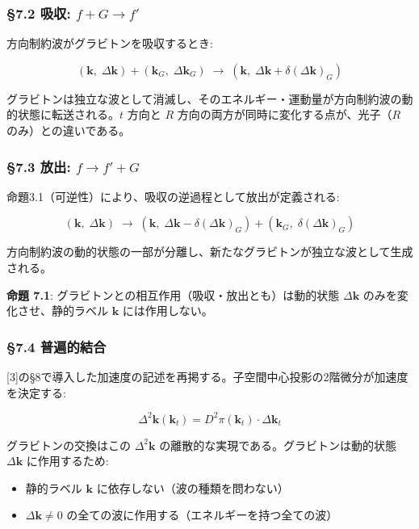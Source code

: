 \documentclass[
  a4paper,11pt]{ltjsarticle}
\providecommand{\tightlist}{%
  \setlength{\itemsep}{0pt}\setlength{\parskip}{0pt}}
\theoremstyle{definition}
\theoremstyle{remark}
\begin{document}
\subsubsection{\texorpdfstring{§7.2 吸収:
\(f + G \to f'\)}{§7.2 吸収: f + G \textbackslash to f\textquotesingle{}}}\label{ux5438ux53ce-f-g-to-f}

方向制約波がグラビトンを吸収するとき:

\[(\mathbf{k},\; \Delta\mathbf{k}) + (\mathbf{k}_G,\; \Delta\mathbf{k}_G) \;\longrightarrow\; (\mathbf{k},\; \Delta\mathbf{k} + \delta(\Delta\mathbf{k})_G)\]

グラビトンは独立な波として消滅し、そのエネルギー・運動量が方向制約波の動的状態に転送される。\(t\)
方向と \(R\) 方向の両方が同時に変化する点が、光子（\(R\)
のみ）との違いである。

\subsubsection{\texorpdfstring{§7.3 放出:
\(f \to f' + G\)}{§7.3 放出: f \textbackslash to f\textquotesingle{} + G}}\label{ux653eux51fa-f-to-f-g}

命題3.1（可逆性）により、吸収の逆過程として放出が定義される:

\[(\mathbf{k},\; \Delta\mathbf{k}) \;\longrightarrow\; (\mathbf{k},\; \Delta\mathbf{k} - \delta(\Delta\mathbf{k})_G) + (\mathbf{k}_G,\; \delta(\Delta\mathbf{k})_G)\]

方向制約波の動的状態の一部が分離し、新たなグラビトンが独立な波として生成される。

\textbf{命題 7.1}: グラビトンとの相互作用（吸収・放出とも）は動的状態
\(\Delta\mathbf{k}\) のみを変化させ、静的ラベル \(\mathbf{k}\)
には作用しない。

\subsubsection{§7.4 普遍的結合}\label{ux666eux904dux7684ux7d50ux5408}

{[}3{]}の§8で導入した加速度の記述を再掲する。子空間中心投影の2階微分が加速度を決定する:

\[\Delta^2\mathbf{k}(\mathbf{k}_t) = D^2\pi(\mathbf{k}_t) \cdot \Delta\mathbf{k}_t\]

グラビトンの交換はこの \(\Delta^2\mathbf{k}\)
の離散的な実現である。グラビトンは動的状態 \(\Delta\mathbf{k}\)
に作用するため:

\begin{itemize}
\tightlist
\item
  静的ラベル \(\mathbf{k}\) に依存しない（波の種類を問わない）
\item
  \(\Delta\mathbf{k} \neq 0\)
  の全ての波に作用する（エネルギーを持つ全ての波）
\end{itemize}
\end{document}

